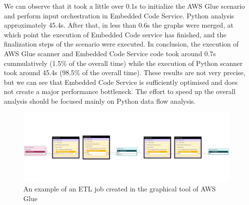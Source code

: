 We can observe that it took a little over 0.1s to initialize the AWS Glue scenario and perform input orchestration in Embedded Code Service. Python analysis approximately 45.4s. After that, in less than 0.6s the graphs were merged, at which point the execution of Embedded Code service has finished, and the finalization steps of the scenario were executed. In conclusion, the execution of AWS Glue scanner and Embedded Code Service code took around 0.7s cummulatively (1.5\% of the overall time) while the execution of Python scanner took around 45.4s (98.5\% of the overall time). These results are not very precise, but we can see that Embedded Code Service is sufficiently optimised and does not create a major performance bottleneck. The effort to speed up the overall analysis should be focused mainly on Python data flow analysis.


\begin{figure}[ht]\centering
\includegraphics[angle=90,origin=c,height=1.0\textwidth]{img/thesis_demo1.PNG}
\caption{An example of an ETL job created in the graphical tool of AWS Glue}
\label{fig:thesisDemo1}
\end{figure}

